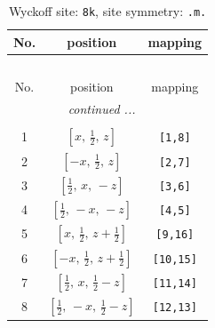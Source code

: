 \documentclass[fleqn,8pt]{jsarticle}
\begin{document}
\begin{longtable}{ccc}
\caption{Wyckoff site: {\tt 8k}, site symmetry: {\tt .m.}}
 \\
 \hline \hline
No. & position & mapping \\ \hline \endfirsthead

\multicolumn{2}{l}{\tablename\ \thetable{}} \\
 \hline \hline
No. & position & mapping \\ \hline \endhead

 \hline \hline
\multicolumn{2}{r}{\footnotesize\it continued ...} \\ \endfoot

 \hline \hline
\multicolumn{2}{r}{} \\ \endlastfoot

1 & $\left[ x,\, \frac{1}{2},\, z \right]$ & {\tt [1,8]} \\ \hline
2 & $\left[ - x,\, \frac{1}{2},\, z \right]$ & {\tt [2,7]} \\ \hline
3 & $\left[ \frac{1}{2},\, x,\, - z \right]$ & {\tt [3,6]} \\ \hline
4 & $\left[ \frac{1}{2},\, - x,\, - z \right]$ & {\tt [4,5]} \\ \hline
5 & $\left[ x,\, \frac{1}{2},\, z + \frac{1}{2} \right]$ & {\tt [9,16]} \\ \hline
6 & $\left[ - x,\, \frac{1}{2},\, z + \frac{1}{2} \right]$ & {\tt [10,15]} \\ \hline
7 & $\left[ \frac{1}{2},\, x,\, \frac{1}{2} - z \right]$ & {\tt [11,14]} \\ \hline
8 & $\left[ \frac{1}{2},\, - x,\, \frac{1}{2} - z \right]$ & {\tt [12,13]} \\
\end{longtable}
\renewcommand{\arraystretch}{1.2}
\end{document}
